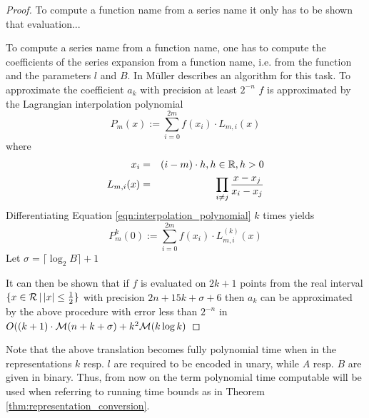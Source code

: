 	 \begin{proof}
	 	To compute a function name from a series name it only has to be shown that evaluation...

	 	To compute a series name from a function name, one has to compute the coefficients of the series expansion from a function name, i.e. from the function and the parameters $l$ and $B$.
	 	In \cite{Mue} M\"uller describes an algorithm for this task.
	 	To approximate the coefficient $a_k$ with precision at least $2^{-n}$ $f$ is approximated by the Lagrangian interpolation
	 	polynomial
	 	\begin{equation}\label{eqn:interpolation_polynomial}
	 		P_m(x)  :=  \sum_{i=0}^{2m} f(x_i) \cdot L_{m,i}(x) 
	 	\end{equation}
	 	where
	 	\begin{eqnarray*}
	 		x_i & = & (i-m) \cdot h , h \in \mathbb R, h > 0 \\
	 		L_{m,i}(x) & = & \prod_{i \neq j} \frac{x-x_j}{x_i-x_j} 
	 	\end{eqnarray*}
	 	Differentiating Equation \ref{eqn:interpolation_polynomial} $k$ times yields
	 	\begin{equation}\label{eqn:interpolation_polynomial_diff}
	 		P_m^k(0)  :=  \sum_{i=0}^{2m} f(x_i) \cdot L_{m,i}^{(k)}(x) 
	 	\end{equation}
	 	Let $\sigma = \lceil \log_2 B \rceil + 1$

	 	It can then be shown that if $f$ is evaluated on $2k+1$ points from the 
	 	real interval $\{x \in \mathcal R \,|\, |x| \leq \frac{1}{2}\}$ with precision $2n+15k+\sigma+6$ 
	 	then $a_k$ can be approximated by the above procedure with error less than $2^{-n}$ in 
	 	$O((k+1)\cdot \mathcal M(n+k+\sigma) + k^2 \mathcal M (k \log k)$

	 \end{proof}
	 Note that the above translation becomes fully polynomial time when in the representations $k$ resp. $l$ are required to be encoded in unary, while $A$ resp. $B$ are given in binary.
	 Thus, from now on the term polynomial time computable will be used when referring to running time bounds as in Theorem \ref{thm:representation_conversion}.
